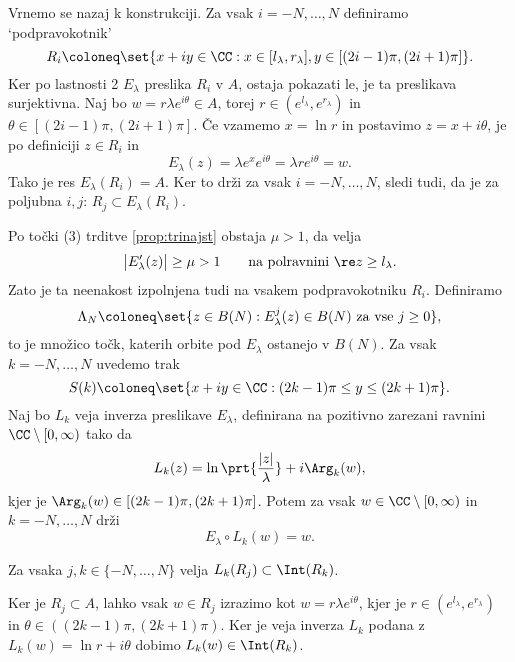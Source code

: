\noindent Vrnemo se nazaj k konstrukciji. Za vsak \(i = -N, \dots, N\) definiramo `podpravokotnik'
\[R_i \coloneq \set{x + iy \in \CC : x \in [l_\lambda, r_\lambda], y \in [(2i - 1) \pi, (2i + 1) \pi]}.\]
Ker po lastnosti 2 \(E_\lambda\) preslika \(R_i\) v \(A\), ostaja pokazati le, je ta preslikava surjektivna. Naj bo \(w = r \lambda e^{i \theta} \in A\), torej \(r \in (e^{l_\lambda}, e^{r_\lambda})\) in \(\theta \in [(2i - 1) \pi, (2i + 1) \pi]\). Če vzamemo \(x = \ln r\) in postavimo \(z = x + i \theta\), je po definiciji \(z \in R_i\) in
\[E_\lambda (z) = \lambda e^x e^{i \theta} = \lambda r e^{i \theta} = w.\]
Tako je res \(E_\lambda (R_i) = A\). Ker to drži za vsak \(i = -N, \dots, N\), sledi tudi, da je za poljubna \(i, j\): \(R_j \subset E_\lambda (R_i)\).

Po točki (3) trditve \ref{prop:trinajst} obstaja \(\mu > 1\), da velja
\begin{equation} \label{eqn:mu-ocena}
    \bigl| E_\lambda' (z) \bigr| \geq \mu > 1 \qquad \text{na polravnini } \re z \geq l_\lambda.
\end{equation}
Zato je ta neenakost izpolnjena tudi na vsakem podpravokotniku \(R_i\). Definiramo
\[\Lambda_N \coloneq \set{z \in B(N) : E_\lambda^j (z) \in B (N) \text{ za vse } j \geq 0},\]
to je množico točk, katerih orbite pod \(E_\lambda\) ostanejo v \(B (N)\). Za vsak \(k = -N, \dots, N\) uvedemo trak
\[S (k) \coloneq \set{x + i y \in \CC : (2k - 1) \pi \leq y \leq (2k + 1) \pi}.\]
Naj bo \(L_k\) veja inverza preslikave \(E_\lambda\), definirana na pozitivno zarezani ravnini \(\CC \setminus [0, \infty)\) tako da
\[L_k (z) = \ln \prt{\frac{|z|}{\lambda}} + i \Arg_k (w),\]
kjer je \(\Arg_k (w) \in [(2k - 1) \pi, (2k + 1) \pi]\). Potem za vsak \(w \in \CC \setminus [0, \infty)\) in \(k = - N, \dots, N\) drži
\begin{equation} \label{eqn:inverz-e}
    E_\lambda \circ L_k (w) = w.
\end{equation}

\begin{trditev} \label{prop:claim}
    Za vsaka \(j, k \in \{-N, \dots, N\}\) velja \(L_k (R_j) \subset \Int (R_k)\).
\end{trditev}

\begin{dokaz}
    Ker je \(R_j \subset A\), lahko vsak \(w \in R_j\) izrazimo kot \(w = r \lambda e^{i \theta}\), kjer je \(r \in (e^{l_\lambda}, e^{r_\lambda})\) in \(\theta \in ((2k - 1) \pi, (2k + 1) \pi)\). Ker je veja inverza \(L_k\) podana z \(L_k (w) = \ln r + i \theta\) dobimo \(L_k (w) \in \Int (R_k)\).
\end{dokaz}

